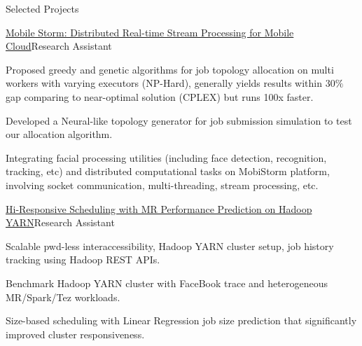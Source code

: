 \documentclass{resume} %
\begin{document}
\begin{rSection}{Selected Projects}
\begin{rSubsection}{\href{http://ieeexplore.ieee.org/document/7335296/?arnumber=7335296}{Mobile Storm: Distributed Real-time Stream Processing for Mobile Cloud}}{Research Assistant}{}{}
\item Proposed greedy and genetic algorithms for job topology allocation on multi workers with varying executors (NP-Hard), generally yields results within $30\%$ gap comparing to near-optimal solution (CPLEX) but runs 100x faster.
\item Developed a Neural-like topology generator for job submission simulation to test our allocation algorithm.
\item Integrating facial processing utilities (including face detection, recognition, tracking, etc) and distributed computational tasks on MobiStorm platform, involving socket communication, multi-threading, stream processing, etc.

\end{rSubsection}

\begin{rSubsection}{\href{http://ieeexplore.ieee.org/document/7579961/}{Hi-Responsive Scheduling with MR Performance Prediction on Hadoop YARN}}{Research Assistant}{}{}
\item Scalable pwd-less interaccessibility, Hadoop YARN cluster setup, job history tracking using Hadoop REST APIs.
\item Benchmark Hadoop YARN cluster with FaceBook trace and heterogeneous MR/Spark/Tez workloads.
\item Size-based scheduling with Linear Regression job size prediction that significantly improved cluster responsiveness.

\end{rSubsection}






\end{rSection}
\end{document}
